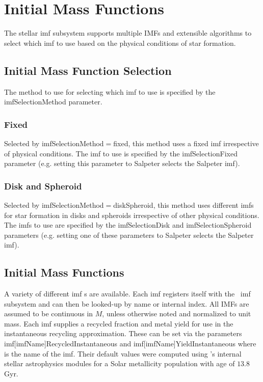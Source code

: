 \section{Initial Mass Functions}

The stellar \gls{imf} subsystem supports multiple IMFs and extensible algorithms to select which \gls{imf} to use based on the physical conditions of star formation.

\subsection{Initial Mass Function Selection}

The method to use for selecting which \gls{imf} to use is specified by the {\normalfont \ttfamily imfSelectionMethod} parameter.

\subsubsection{Fixed}

Selected by {\normalfont \ttfamily imfSelectionMethod}$=${\normalfont \ttfamily fixed}, this method uses a fixed \gls{imf} irrespective of physical conditions. The \gls{imf} to use is specified by the {\normalfont \ttfamily imfSelectionFixed} parameter (e.g. setting this parameter to {\normalfont \ttfamily Salpeter} selects the Salpeter \gls{imf}).

\subsubsection{Disk and Spheroid}

Selected by {\normalfont \ttfamily imfSelectionMethod}$=${\normalfont \ttfamily diskSpheroid}, this method uses different {\gls{imf}}s for star formation in disks and spheroids irrespective of other physical conditions. The {\gls{imf}}s to use are specified by the {\normalfont \ttfamily imfSelectionDisk} and {\normalfont \ttfamily imfSelectionSpheroid} parameters (e.g. setting one of these parameters to {\normalfont \ttfamily Salpeter} selects the Salpeter \gls{imf}).

\subsection{Initial Mass Functions}\label{sec:physicsIMF}

A variety of different \gls{imf} s are available. Each \gls{imf} registers itself with the \glc\ \gls{imf} subsystem and can then be looked-up by name or internal index. All IMFs are assumed to be continuous in $M$, unless otherwise noted and normalized to unit mass. Each \gls{imf} supplies a recycled fraction and metal yield for use in the instantaneous recycling approximation. These can be set via the parameters {\normalfont \ttfamily imf[imfName]RecycledInstantaneous} and {\normalfont \ttfamily imf[imfName]YieldInstantaneous} where {\normalfont \ttfamily [imfName]} is the name of the \gls{imf}. Their default values were computed using \glc 's internal stellar astrophysics modules for a Solar metallicity population with age of $13.8$ Gyr.

